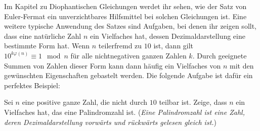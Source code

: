 Im Kapitel zu Diophantischen Gleichungen werdet ihr sehen, wie der Satz von Euler-Fermat ein unverzichtbares Hilfsmittel bei solchen Gleichungen ist. Eine weitere typische Anwendung des Satzes sind Aufgaben, bei denen ihr zeigen sollt, dass eine natürliche Zahl $n$ ein Vielfaches hat, dessen Dezimaldarstellung eine bestimmte Form hat. Wenn $n$ teilerfremd zu $10$ ist, dann gilt $10^{k\varphi(n)}\equiv 1\mod n$ für alle nichtnegativen ganzen Zahlen $k$. Durch geeignete Summen von Zahlen dieser Form kann dann häufig ein Vielfaches von $n$ mit den gewünschten Eigenschaften gebastelt werden. Die folgende Aufgabe ist dafür ein perfektes Beispiel:
\begin{aufgabe*}
	Sei $n$ eine positive ganze Zahl, die nicht durch $10$ teilbar ist. Zeige, dass $n$ ein Vielfaches hat, das eine Palindromzahl ist. (\emph{Eine Palindromzahl ist eine Zahl, deren Dezimaldarstellung vorwärts und rückwärts gelesen gleich ist.})
\end{aufgabe*}
